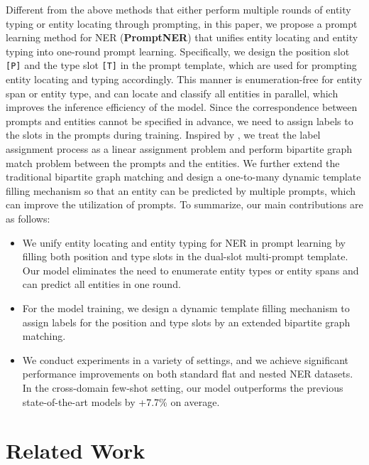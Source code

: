 \documentclass[11pt]{article}
\begin{document}
Different from the above methods that either perform multiple rounds of entity typing or entity locating through prompting, in this paper, we propose a prompt learning method for NER (\textbf{PromptNER}) that unifies entity locating and entity typing into one-round prompt learning. Specifically, we design the position slot \texttt{[P]} and the type slot \texttt{[T]} in the prompt template, which are used for prompting entity locating and typing accordingly. This manner is enumeration-free for entity span or entity type, and can locate and classify all entities in parallel, which improves the inference efficiency of the model.
Since the correspondence between prompts and entities cannot be specified in advance, we need to assign labels to the slots in the prompts during training. 
Inspired by \citet{10.1007/978-3-030-58452-8_13}, we treat the label assignment process as a linear assignment problem and perform bipartite graph match problem between the prompts and the entities. We further extend the traditional bipartite graph matching and design a one-to-many dynamic template filling mechanism so that an entity can be predicted by multiple prompts, which can improve the utilization of prompts. To summarize, our main contributions are as follows:


\begin{itemize}
\item We unify entity locating and entity typing for NER in prompt learning by filling both position and type slots in the dual-slot multi-prompt template. Our model eliminates the need to enumerate entity types or entity spans and can predict all entities in one round.
\item For the model training, we design a dynamic template filling mechanism to assign labels for the position and type slots by an extended bipartite graph matching.
\item We conduct experiments in a variety of settings, and we achieve significant performance improvements on both standard flat and nested NER datasets. In the cross-domain few-shot setting, our model outperforms the previous state-of-the-art models by +7.7\% on average. 
\end{itemize}


\section{Related Work}
\end{document}
